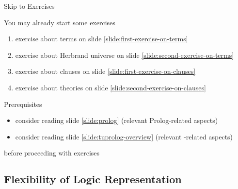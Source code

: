 \documentclass[presentation]{beamer}\mode<presentation>{\usetheme{AMSBolognaFC}}
\begin{document}
\begin{frame}{Skip to Exercises} 
    \begin{block}{You may already start some exercises}
        \begin{enumerate}
            \item exercise about terms on slide \ref{slide:first-exercise-on-terms}
            \item exercise about Herbrand universe on slide \ref{slide:second-exercise-on-terms}
            \item exercise about clauses on slide \ref{slide:first-exercise-on-clauses}
            \item exercise about theories on slide \ref{slide:second-exercise-on-clauses}
        \end{enumerate}
    \end{block}

    \begin{alertblock}{Prerequisites}
        \begin{itemize}
            \item consider reading slide \ref{slide:prolog} (relevant Prolog-related aspects)
            \item consider reading slide \ref{slide:tuprolog-overview} (relevant \twopkt{}-related aspects)
        \end{itemize}
        before proceeding with exercises
    \end{alertblock}
\end{frame}

\subsection{Flexibility of Logic Representation}
\end{document}

